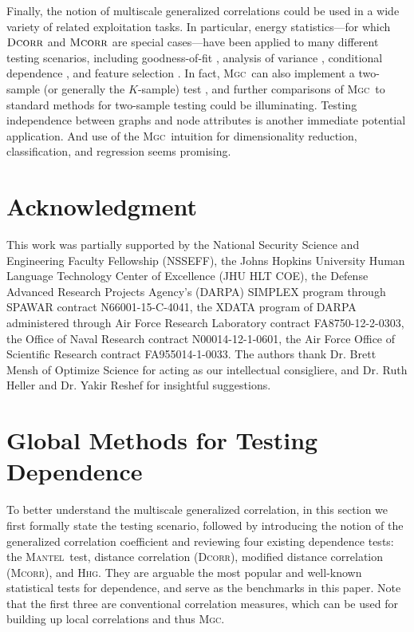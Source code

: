 \documentclass[11pt]{article}
\providecommand{\sct}[1]{{\normalfont\textsc{#1}}}
\newcommand{\Mgc}{\sct{Mgc}}
\newcommand{\Hhg}{\sct{Hhg}}
\newcommand{\Dcorr}{\sct{Dcorr}}
\newcommand{\Mcorr}{\sct{Mcorr}}
\newcommand{\Mantel}{\sct{Mantel}}
\begin{document}
Finally, the notion of multiscale generalized correlations could be used in a wide variety of related exploitation tasks.  In particular, energy statistics---for which $\Dcorr$ and $\Mcorr$ are special cases---have been applied to many different testing scenarios, including goodness-of-fit  \cite{Szekely2005}, analysis of variance  \cite{Rizzo2010}, conditional dependence  \cite{Szekely2014,Wang2015},   and feature selection \cite{LiZhongZhu2012,Zhong2015}.     
In fact, \Mgc~can also implement a two-sample (or generally the $K$-sample) test \cite{Szekely2004, heller2016consistent}, and further comparisons of \Mgc~to standard methods for two-sample testing could be illuminating.
Testing independence between graphs and node attributes \cite{Fosdick2015} is another immediate potential application.  And use of the \Mgc~intuition for dimensionality reduction, classification, and regression seems promising.



\clearpage
\pagestyle{empty}




\section*{Acknowledgment}
This work was partially supported by the
%
National Security Science and Engineering Faculty Fellowship (NSSEFF),
%
the Johns Hopkins University Human Language Technology Center of Excellence (JHU HLT COE),  the
%
Defense Advanced Research Projects Agency's (DARPA) SIMPLEX program through SPAWAR contract N66001-15-C-4041,
%
the XDATA program of DARPA administered through Air Force Research Laboratory contract FA8750-12-2-0303,
%
the Office of Naval Research contract N00014-12-1-0601,
%
the Air Force Office of Scientific Research contract FA955014-1-0033. The authors thank Dr. Brett Mensh of Optimize Science for acting as our intellectual consigliere, and Dr. Ruth Heller and Dr. Yakir Reshef for insightful suggestions.


\clearpage
\appendix
\setcounter{figure}{0}
\renewcommand{\thealgorithm}{C\arabic{algorithm}}
\renewcommand{\thefigure}{E\arabic{figure}}
\renewcommand{\thesubsection}{\thesection.\Roman{subsection}}

\section{Global Methods for Testing Dependence}
\label{appen:global}
To better understand the multiscale generalized correlation, in this section we first formally state the testing scenario, followed by introducing the notion of the generalized correlation coefficient and reviewing four existing dependence tests: the \Mantel~test, distance correlation (\Dcorr), modified distance correlation (\Mcorr), and \Hhg. They are arguable the most popular and well-known statistical tests for dependence, and serve as the benchmarks in this paper. Note that the first three are conventional correlation measures, which can be used for building up local correlations and thus  \Mgc.
\end{document}
